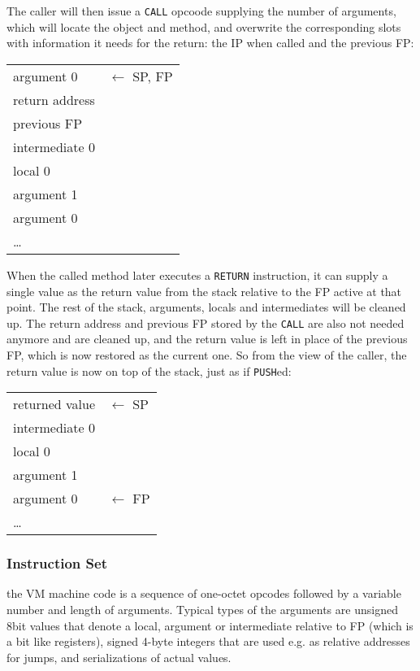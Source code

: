 \documentclass[12pt,a4paper]{article}
\begin{document}
The caller will then issue a \verb|CALL| opcoode supplying the number of arguments, which will locate the object and method, and overwrite the corresponding slots with information it needs for the return: the IP when called and the previous FP:

\begin{table}[H]
\centering
\begin{tabular}{|p{3cm}|p{3cm}}
argument 0 & $\leftarrow$ SP, FP \\
\cline{1-1}
return address \\
previous FP \\
intermediate 0 \\
local 0    \\    
argument 1 \\
argument 0 \\
\cline{1-1}
\ldots & \\
\end{tabular}
\end{table}

When the called method later executes a \verb|RETURN| instruction, it can supply a single value as the return value from the stack relative to the FP active at that point. The rest of the stack, arguments, locals and intermediates will be cleaned up. The return address and previous FP stored by the \verb|CALL| are also not needed anymore and are cleaned up, and the return value is left in place of the previous FP, which is now restored as the current one. So from the view of the caller, the return value is now on top of the stack, just as if \verb|PUSH|ed:

\begin{table}[H]
\centering
\begin{tabular}{|p{3cm}|p{3cm}}
returned value & $\leftarrow$ SP \\
intermediate 0 \\
local 0    \\    
argument 1 \\
argument 0 & $\leftarrow$ FP \\ 
\cline{1-1}
\ldots & \\
\end{tabular}
\end{table}

\subsubsection{Instruction Set}\label{sec:instructionset}

the VM machine code is a sequence of one-octet opcodes followed by a variable number and length of arguments. Typical types of the arguments are unsigned 8bit values that denote a local, argument or intermediate relative to FP (which is a bit like registers), signed 4-byte integers that are used e.g. as relative addresses for jumps, and serializations of actual values.
\end{document}
